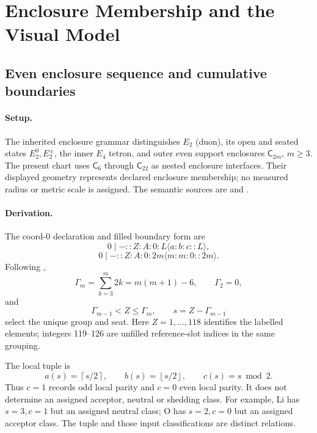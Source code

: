 \section{Enclosure Membership and the Visual Model}\label{sec:coord0-enclosures}

\subsection{Even enclosure sequence and cumulative boundaries}\label{subsec:coord0-grouping-derivation}
\paragraph{Setup.}
The inherited enclosure grammar distinguishes \(E_2\) (duon), its open and seated states \(E_2^0,E_2^\pm\), the inner \(E_4\) tetron, and outer even support enclosures \(\mathsf C_{2m}\), \(m\ge3\). The present chart uses \(\mathsf C_6\) through \(\mathsf C_{22}\) as nested enclosure interfaces. Their displayed geometry represents declared enclosure membership; no measured radius or metric scale is assigned. The semantic sources are  and .

\paragraph{Derivation.}
The coord-0 declaration and filled boundary form are
\begin{equation}
0\mid-::Z:A:0:L\langle a:b:c::L\rangle,
\label{eq:matter1-coord0-declaration}
\end{equation}
\begin{equation}
0\mid-::Z:A:0:2m\langle m:m:0::2m\rangle.
\label{eq:matter1-filled-shared-enclosure}
\end{equation}
Following ,
\begin{equation}
\Gamma_m=\sum_{k=3}^{m}2k=m(m+1)-6,\qquad \Gamma_2=0,
\label{eq:matter1-gamma-m}
\end{equation}
and
\begin{equation}
\Gamma_{m-1}<Z\le\Gamma_m,\qquad s=Z-\Gamma_{m-1}
\label{eq:matter1-group-selection}
\end{equation}
select the unique group and seat. Here \(Z=1,\ldots,118\) identifies the labelled elements; integers 119--126 are unfilled reference-slot indices in the same grouping.

The local tuple is
\begin{equation}
a(s)=\left\lceil s/2\right\rceil,\qquad
b(s)=\left\lfloor s/2\right\rfloor,\qquad c(s)=s\bmod2.
\label{eq:matter1-seat-abc}
\end{equation}
Thus \(c=1\) records odd local parity and \(c=0\) even local parity. It does not determine an assigned acceptor, neutral or shedding class. For example, Li has \(s=3,c=1\) but an assigned neutral class; O has \(s=2,c=0\) but an assigned acceptor class. The tuple and those input classifications are distinct relations.

